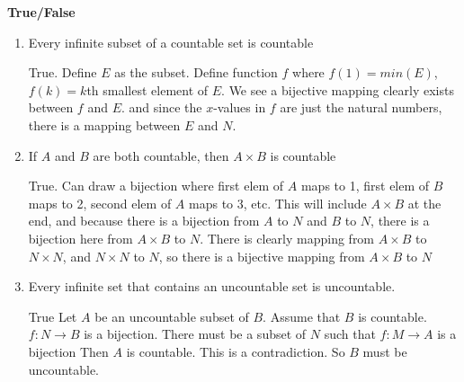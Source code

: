 \question \textbf{True/False} 
\begin{enumerate}[label=(\alph*)]
\item Every infinite subset of a countable set is countable
\begin{solution}
True. Define $E$ as the subset. Define function $f$ where $f(1) = min(E)$, 
$f(k) = k$th smallest element of $E$. We see a bijective mapping clearly 
exists between $f$ and $E$. and since the $x$-values in $f$ are just the natural 
numbers, there is a mapping between $E$ and $N$.
\end{solution}

\item If $A$ and $B$ are both countable, then $A \times B$ is countable
\begin{solution}
True. Can draw a bijection where first elem of $A$ maps to 1, first elem 
of $B$ maps to 2, second elem of $A$ maps to 3, etc. This will include $A \times B$
at the end, and because there is a bijection from $A$ to $N$ and $B$ to $N$, there is a bijection here from $A \times B$ to $N$. There is clearly mapping from 
$A \times B$ to $N \times N$, and $N \times N$ to $N$, so there is a 
bijective mapping from $A \times B$ to $N$
\end{solution}

\item Every infinite set that contains an uncountable set is uncountable. 
\begin{solution}
True
Let $A$ be an uncountable subset of $B$.
Assume that $B$ is countable.
$f: N \rightarrow B$ is a bijection.
There must be a subset of $N$ such that $f: M \rightarrow A$ is a bijection
Then $A$ is countable.
This is a contradiction.
So $B$ must be uncountable.
\end{solution}
\end{enumerate}